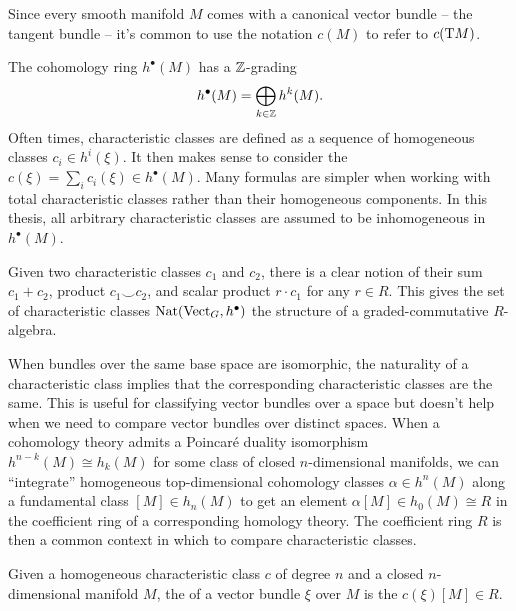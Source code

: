 \begin{convention*}
	Since every smooth manifold $M$ comes with a canonical vector bundle -- the tangent bundle -- it's common to use the notation $c(M)$ to refer to $c(\mathrm{T} M)$.
\end{convention*}

\begin{remark}
	The cohomology ring $h^\bullet(M)$ has a $\mathbb{Z}$-grading
	\[
		h^\bullet(M) = \bigoplus_{k\in \mathbb{Z}} h^k(M).
	\]
	Often times, characteristic classes are defined as a sequence of homogeneous classes $c_i\in h^{i}(\xi)$. It then makes sense to consider the  $c(\xi)=\sum_i c_i(\xi)\in h^\bullet(M)$. Many formulas are simpler when working with total characteristic classes rather than their homogeneous components. In this thesis, all arbitrary characteristic classes are assumed to be inhomogeneous in $h^\bullet(M)$.
\end{remark}

\begin{remark}
	Given two characteristic classes $c_1$ and $c_2$, there is a clear notion of their sum $c_1+c_2$, product $c_1\smile c_2$, and scalar product $r\cdot c_1$ for any $r\in R$. This gives the set of characteristic classes $\operatorname{Nat}(\operatorname{Vect}_G, h^\bullet)$ the structure of a graded-commutative $R$-algebra.
\end{remark}

When bundles over the same base space are isomorphic, the naturality of a characteristic class implies that the corresponding characteristic classes are the same. This is useful for classifying vector bundles over a space but doesn't help when we need to compare vector bundles over distinct spaces.
When a cohomology theory admits a Poincar\'e duality isomorphism $h^{n-k}(M) \cong h_k(M)$ for some class of closed $n$-dimensional manifolds, we can ``integrate'' homogeneous top-dimensional cohomology classes $\alpha\in h^{n}(M)$ along a fundamental class $[M]\in h_n(M)$ to get an element $\alpha[M]\in h_0(M)\cong R$ in the coefficient ring of a corresponding homology theory. The coefficient ring $R$ is then a common context in which to compare characteristic classes.

\begin{definition}\label{defn:characteristic-numbers}
	Given a homogeneous characteristic class $c$ of degree $n$ and a closed $n$-dimensional manifold $M$, the  of a vector bundle $\xi$ over $M$ is the $c(\xi)[M] \in R$.
\end{definition}

